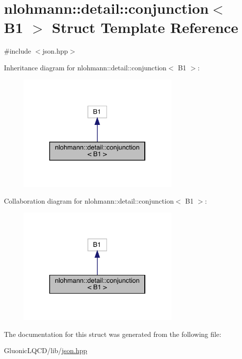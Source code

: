 \hypertarget{structnlohmann_1_1detail_1_1conjunction_3_01_b1_01_4}{}\section{nlohmann\+::detail\+::conjunction$<$ B1 $>$ Struct Template Reference}
\label{structnlohmann_1_1detail_1_1conjunction_3_01_b1_01_4}


{\ttfamily \#include $<$json.\+hpp$>$}



Inheritance diagram for nlohmann\+::detail\+::conjunction$<$ B1 $>$\+:\nopagebreak
\begin{figure}[H]
\begin{center}
\leavevmode
\includegraphics[width=226pt]{structnlohmann_1_1detail_1_1conjunction_3_01_b1_01_4__inherit__graph}
\end{center}
\end{figure}


Collaboration diagram for nlohmann\+::detail\+::conjunction$<$ B1 $>$\+:\nopagebreak
\begin{figure}[H]
\begin{center}
\leavevmode
\includegraphics[width=226pt]{structnlohmann_1_1detail_1_1conjunction_3_01_b1_01_4__coll__graph}
\end{center}
\end{figure}


The documentation for this struct was generated from the following file\+:\begin{DoxyCompactItemize}
\item 
Gluonic\+L\+Q\+C\+D/lib/\mbox{\hyperlink{json_8hpp}{json.\+hpp}}\end{DoxyCompactItemize}
